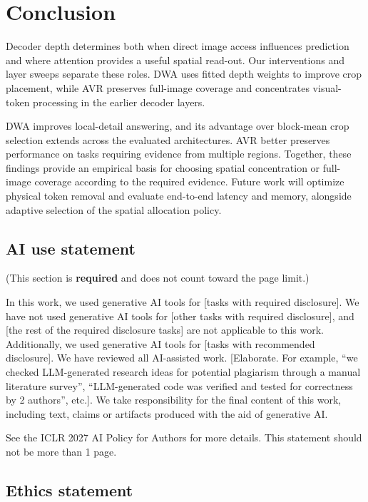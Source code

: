 \documentclass{article} %
\begin{document}
\section{Conclusion}
\label{sec:conclusion}

Decoder depth determines both when direct image access influences
prediction and where attention provides a useful spatial read-out.
Our interventions and layer sweeps separate these roles. DWA uses
fitted depth weights to improve crop placement, while AVR preserves
full-image coverage and concentrates visual-token processing in the
earlier decoder layers.

DWA improves local-detail answering, and its advantage over block-mean
crop selection extends across the evaluated architectures. AVR better preserves performance on tasks
requiring evidence from multiple regions. Together, these findings
provide an empirical basis for choosing spatial concentration or
full-image coverage according to the required evidence. Future work
will optimize physical token removal and evaluate end-to-end latency
and memory, alongside adaptive selection of the spatial allocation policy.

\subsection*{AI use statement}

(This section is \textbf{required} and does not count toward the page limit.)

In this work, we used generative AI tools for [tasks with required disclosure].
We have not used generative AI tools for [other tasks with required disclosure],
and [the rest of the required disclosure tasks] are not applicable to this work.
Additionally, we used generative AI tools for [tasks with recommended
disclosure]. We have reviewed all AI-assisted work. [Elaborate. For example, ``we
checked LLM-generated research ideas for potential plagiarism through a manual
literature survey'', ``LLM-generated code was verified and tested for correctness
by 2 authors'', etc.]. We take responsibility for the final content of this work,
including text, claims or artifacts produced with the aid of generative AI.

See the ICLR 2027 AI Policy for Authors for more details. This statement should
not be more than 1 page.

\subsection*{Ethics statement}
\end{document}
